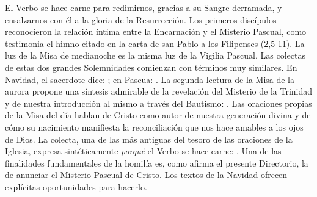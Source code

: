 El Verbo se hace carne para redimirnos, gracias a su Sangre derramada, y ensalzarnos con él a la gloria de la Resurrección. Los primeros discípulos reconocieron la relación íntima entre la Encarnación y el Misterio Pascual, como testimonia el himno citado en la carta de san Pablo a los Filipenses (2,5-11). La luz de la Misa de medianoche es la misma luz de la Vigilia Pascual. Las colectas de estas dos grandes Solemnidades comienzan con términos muy similares. En Navidad, el sacerdote dice: ; en Pascua: . La segunda lectura de la Misa de la aurora propone una síntesis admirable de la revelación del Misterio de la Trinidad y de nuestra introducción al mismo a través del Bautismo: . Las oraciones propias de la Misa del día hablan de Cristo como autor de nuestra generación divina y de cómo su nacimiento manifiesta la reconciliación que nos hace amables a los ojos de Dios. La colecta, una de las más antiguas del tesoro de las oraciones de la Iglesia, expresa sintéticamente \emph{porqué} el Verbo se hace carne: . Una de las finalidades fundamentales de la homilía es, como afirma el presente Directorio, la de anunciar el Misterio Pascual de Cristo. Los textos de la Navidad ofrecen explícitas oportunidades para hacerlo.

